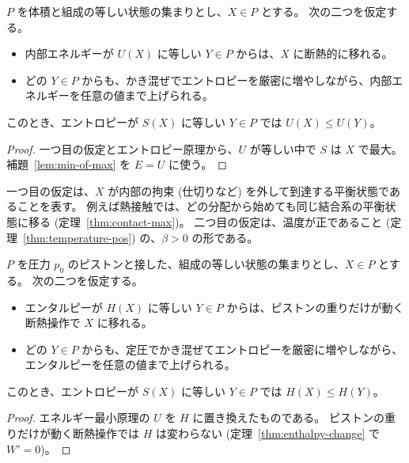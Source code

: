 \begin{theorem}[エネルギー最小原理]
  \label{thm:energy-min}
  \leanok
  $P$ を体積と組成の等しい状態の集まりとし、$X \in P$ とする。
  次の二つを仮定する。
  \begin{itemize}
    \item 内部エネルギーが $U(X)$ に等しい $Y \in P$ からは、$X$ に断熱的に移れる。
    \item どの $Y \in P$ からも、かき混ぜでエントロピーを厳密に増やしながら、内部エネルギーを任意の値まで上げられる。
  \end{itemize}
  このとき、エントロピーが $S(X)$ に等しい $Y \in P$ では $U(X) \le U(Y)$。
\end{theorem}

\begin{proof}
  \leanok
  一つ目の仮定とエントロピー原理から、$U$ が等しい中で $S$ は $X$ で最大。
  補題~\ref{lem:min-of-max} を $E = U$ に使う。
\end{proof}

一つ目の仮定は、$X$ が内部の拘束 (仕切りなど) を外して到達する平衡状態であることを表す。
例えば熱接触では、どの分配から始めても同じ結合系の平衡状態に移る (定理~\ref{thm:contact-max})。
二つ目の仮定は、温度が正であること (定理~\ref{thm:temperature-pos}) の、$\beta > 0$ の形である。

\begin{theorem}[エンタルピー最小原理]
  \label{thm:enthalpy-min}
  \leanok
  $P$ を圧力 $p_0$ のピストンと接した、組成の等しい状態の集まりとし、$X \in P$ とする。
  次の二つを仮定する。
  \begin{itemize}
    \item エンタルピーが $H(X)$ に等しい $Y \in P$ からは、ピストンの重りだけが動く断熱操作で $X$ に移れる。
    \item どの $Y \in P$ からも、定圧でかき混ぜてエントロピーを厳密に増やしながら、エンタルピーを任意の値まで上げられる。
  \end{itemize}
  このとき、エントロピーが $S(X)$ に等しい $Y \in P$ では $H(X) \le H(Y)$。
\end{theorem}

\begin{proof}
  \leanok
  エネルギー最小原理の $U$ を $H$ に置き換えたものである。
  ピストンの重りだけが動く断熱操作では $H$ は変わらない (定理~\ref{thm:enthalpy-change} で $W' = 0$)。
\end{proof}

